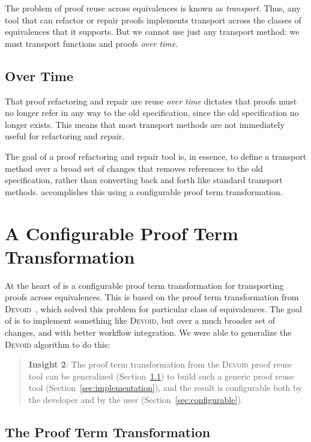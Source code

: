 The problem of proof reuse across equivalences is known as \textit{transport}. %
Thus, any tool that can refactor or repair proofs implements transport across the classes
of equivalences that it supports.
But we cannot use just any transport method: we must transport functions and proofs \textit{over time}.

\subsection{Over Time}
\label{sec:time}

That proof refactoring and repair are reuse \textit{over time} dictates that proofs
must no longer refer in any way to the old specification, since the old specification no longer exists.
This means that most transport methods %
are not immediately useful for refactoring and repair.

The goal of a proof refactoring and repair tool is, in essence, to
define a transport method over a broad set of changes that
removes references to the old specification, rather than converting back and forth
like standard transport methods.
\toolname accomplishes this using a configurable proof term transformation.

\section{A Configurable Proof Term Transformation}
\label{sec:key2}

At the heart of \toolname is a configurable proof term transformation for transporting
proofs across equivalences. This is based on the proof term transformation from 
\textsc{Devoid}~\cite{Ringer2019}, which solved this problem for particular class of equivalences.
The goal of \toolname is to implement something like \textsc{Devoid}, but over
a much broader set of changes, and with better workflow integration.
We were able to generalize the \textsc{Devoid} algorithm to do this:

\begin{quote}
\textbf{Insight 2}:
The proof term transformation from the \textsc{Devoid} proof reuse tool can be generalized (Section~\ref{sec:generic})
to build such a generic proof reuse tool (Section~\ref{sec:implementation}),
and the result is configurable both by the developer and by the user (Section~\ref{sec:configurable}).
\end{quote}

\subsection{The Proof Term Transformation}
\label{sec:generic}

